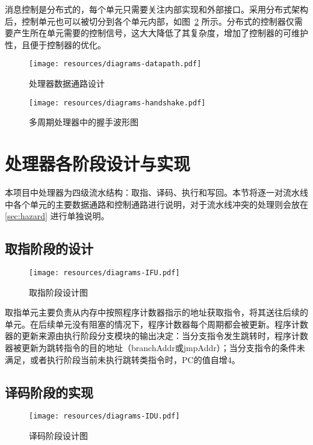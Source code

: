 消息控制是分布式的，每个单元只需要关注内部实现和外部接口。采用分布式架构后，控制单元也可以被切分到各个单元内部，如图~\ref{fig:handshake} 所示。分布式的控制器仅需要产生所在单元需要的控制信号，这大大降低了其复杂度，增加了控制器的可维护性，且便于控制器的优化。

\begin{figure}
    \centering
    \texttt{[image: resources/diagrams-datapath.pdf]}
    \caption{处理器数据通路设计}
    \label{fig:my_label}
\end{figure}

\begin{figure}
    \centering
    \texttt{[image: resources/diagrams-handshake.pdf]}
    \caption{多周期处理器中的握手波形图}
    \label{fig:handshake}
\end{figure}

\section{处理器各阶段设计与实现}

本项目中处理器为四级流水结构：取指、译码、执行和写回。本节将逐一对流水线中各个单元的主要数据通路和控制通路进行说明，对于流水线冲突的处理则会放在\ref{sec:hazard} 进行单独说明。

\subsection{取指阶段的设计}

\begin{figure}
    \centering
    \texttt{[image: resources/diagrams-IFU.pdf]}
    \caption{取指阶段设计图}
    \label{fig:stage-if}
\end{figure}

取指单元主要负责从内存中按照程序计数器指示的地址获取指令，将其送往后续的单元。在后续单元没有阻塞的情况下，程序计数器每个周期都会被更新。程序计数器的更新来源由执行阶段分支模块的输出决定：当分支指令发生跳转时，程序计数器被更新为跳转指令的目的地址（branchAddr或jmpAddr）；当分支指令的条件未满足，或者执行阶段当前未执行跳转类指令时，PC的值自增4。


\subsection{译码阶段的实现}

\begin{figure}
    \centering
    \texttt{[image: resources/diagrams-IDU.pdf]}
    \caption{译码阶段设计图}
    \label{fig:stage-id}
\end{figure}

